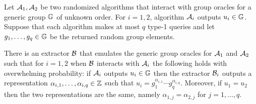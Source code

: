 \begin{lemma}
\label{lem:unique}
Let $\mathcal{A}_1, \mathcal{A}_2$ be two randomized algorithms that interact
with group oracles for a generic group $\mathbb G$ of unknown order.
For $i=1,2$, algorithm $\mathcal{A}_i$ outputs $u_i \in \mathbb G$.
Suppose that each algorithm makes at most $q$ type-1 queries
and let $g_1,\ldots,g_q \in \mathbb G$ be the returned random group elements. 

There is an extractor $\mathcal{B}$ that emulates 
the generic group oracles for $\mathcal{A}_1$ and $\mathcal{A}_2$
such that for $i=1,2$ when $\mathcal{B}$ interacts with $\mathcal{A}_i$ 
the following holds with overwhelming probability:
if $\mathcal{A}_i$ outputs $u_i \in \mathbb G$ 
then the extractor $\mathcal{B}_i$ outputs a representation
$\alpha_{i,1},\ldots,\alpha_{i,q} \in \mathbb Z$
such that $u_i = g_1^{\alpha_{i,1}} \cdots g_q^{\alpha_{i,q}}$.
Moreover, if $u_1 = u_2$ then the two representations are the same,
namely $\alpha_{1,j} = \alpha_{2,j}$ for $j=1,\ldots,q$. 
\end{lemma}

